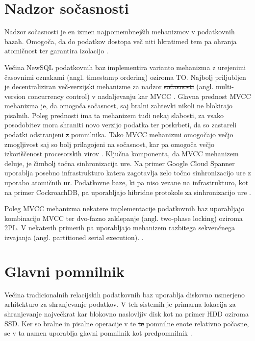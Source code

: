 \documentclass[a4paper, 12pt]{book}
\providecommand{\DIFaddtex}[1]{{\protect\color{blue}\uwave{#1}}} %
\providecommand{\DIFdeltex}[1]{{\protect\color{red}\sout{#1}}}                      %
\providecommand{\DIFaddbegin}{} %
\providecommand{\DIFaddend}{} %
\providecommand{\DIFdelbegin}{} %
\providecommand{\DIFdelend}{} %
\providecommand{\DIFadd}[1]{\texorpdfstring{\DIFaddtex{#1}}{#1}} %
\providecommand{\DIFdel}[1]{\texorpdfstring{\DIFdeltex{#1}}{}} %
\newcommand{\DIFscaledelfig}{0.5}
\newlength{\DIFdelgraphicswidth} %
\newlength{\DIFdelgraphicsheight} %
\newcommand{\DIFaddincludegraphics}[2][]{{\color{blue}\fbox{\DIFOincludegraphics[#1]{#2}}}} %
\newcommand{\DIFdelincludegraphics}[2][]{%
\sbox{\DIFdelgraphicsbox}{\DIFOincludegraphics[#1]{#2}}%
\settoboxwidth{\DIFdelgraphicswidth}{\DIFdelgraphicsbox} %
\settoboxtotalheight{\DIFdelgraphicsheight}{\DIFdelgraphicsbox} %
\scalebox{\DIFscaledelfig}{%
\parbox[b]{\DIFdelgraphicswidth}{\usebox{\DIFdelgraphicsbox}\\[-\baselineskip] \rule{\DIFdelgraphicswidth}{0em}}\llap{\resizebox{\DIFdelgraphicswidth}{\DIFdelgraphicsheight}{%
\setlength{\unitlength}{\DIFdelgraphicswidth}%
\begin{picture}(1,1)%
\thicklines\linethickness{2pt} %
{\color[rgb]{1,0,0}\put(0,0){\framebox(1,1){}}}%
{\color[rgb]{1,0,0}\put(0,0){\line( 1,1){1}}}%
{\color[rgb]{1,0,0}\put(0,1){\line(1,-1){1}}}%
\end{picture}%
}\hspace*{3pt}}} %
} %
\DeclareRobustCommand{\DIFaddbegin}{\DIFOaddbegin \let\includegraphics\DIFaddincludegraphics} %
\DeclareRobustCommand{\DIFaddend}{\DIFOaddend \let\includegraphics\DIFOincludegraphics} %
\DeclareRobustCommand{\DIFdelbegin}{\DIFOdelbegin \let\includegraphics\DIFdelincludegraphics} %
\DeclareRobustCommand{\DIFdelend}{\DIFOaddend \let\includegraphics\DIFOincludegraphics} %
\begin{document}
\section{Nadzor sočasnosti}
Nadzor sočasnosti je en izmen najpomembnejših mehanizmov v podatkovnih bazah. Omogoča, da do podatkov dostopa več niti hkrati\DIFaddbegin \DIFadd{, }\DIFaddend med tem pa ohranja atomičnost ter garantira izolacijo \cite{Pavlo2016Sep}.

Večina NewSQL podatkovnih baz implementira varianto mehanizma z urejenimi časovnimi oznakami (angl. timestamp ordering) oziroma TO. Najbolj priljubljen je decentraliziran več-verzijski mehanizme za nadzor \DIFdelbegin \DIFdel{sočasnosti }\DIFdelend \DIFaddbegin \DIFadd{so\-čas\-no\-sti }\DIFaddend (angl. multi-version concurrency control) v nadaljevanju kar MVCC \cite{Pavlo2016Sep}.
Glavna prednost MVCC mehanizma je, da omogoča sočasnost, saj bralni zahtevki nikoli ne blokirajo pisalnih. Poleg prednosti ima ta mehanizem tudi nekaj slabosti, za vsako posodobitev mora shraniti novo verzijo podatka ter poskrbeti, da so zastareli podatki odstranjeni \DIFdelbegin \DIFdel{z }\DIFdelend \DIFaddbegin \DIFadd{iz }\DIFaddend pomnilnika. Tako MVCC mehanizmi omogočajo večjo zmogljivost saj so bolj prilagojeni na sočasnost, kar pa omogoča večjo izkoriščenost procesorskih virov \cite{MainMemoryDatabaseSystems}. Ključna komponenta, da MVCC mehanizem deluje, je čimbolj točna sinhronizacija ure. Na primer Google Cloud Spanner uporablja posebno infrastrukturo katera zagotavlja zelo točno sinhronizacijo ure z uporabo atomičnih ur. Podatkovne baze, ki pa niso vezane na infrastrukturo, kot na primer CockroachDB, pa uporabljajo hibridne protokole za sinhronizacijo ure \cite{Pavlo2016Sep}.

Poleg MVCC mehanizma nekatere implementacije podatkovnih baz uporabljajo kombinacijo MVCC ter dvo-fazno zaklepanje (angl. two-phase locking) oziroma 2PL. V nekaterih primerih pa uporabljajo mehanizem razbitega sekvenčnega izvajanja (angl. partitioned serial
execution). \cite{Pavlo2016Sep, MainMemoryDatabaseSystems}.

\section{Glavni pomnilnik}

Večina tradicionalnih relacijskih podatkovnih baz uporablja diskovno usmerjeno arhitekturo za shranjevanje podatkov. V teh sistemih je primarna lokacija za shranjevanje največkrat kar blokovno naslovljiv disk kot na primer HDD oziroma SSD. Ker so bralne in pisalne operacije v te \DIFdelbegin \DIFdel{te }\DIFdelend pomnilne enote relativno počasne, se v ta namen uporablja glavni pomnilnik kot predpomnilnik \cite{Pavlo2016Sep}.
\end{document}
